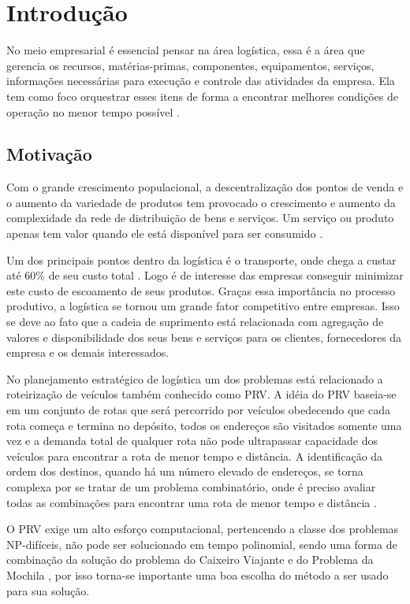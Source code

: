 \chapter[Introdução]{Introdução}

No meio empresarial é essencial pensar na área logística, essa é a área que gerencia os recursos, matérias-primas, componentes, equipamentos, serviços, informações necessárias para execução e controle das atividades da empresa. Ela tem como foco orquestrar esses itens de forma a encontrar melhores condições de operação no menor tempo possível \cite{DIAS}. 

\section{Motivação}

Com o grande crescimento populacional, a descentralização dos pontos de venda e o aumento da variedade de produtos tem provocado o crescimento e aumento da complexidade da rede de distribuição de bens e serviços. Um serviço ou produto apenas tem valor quando ele está disponível para ser consumido \cite{TSUDA}.

Um dos principais pontos dentro da logística é o transporte, onde chega a custar até
60\% de seu custo total \cite{RODRIGUES}. Logo é de interesse das empresas conseguir minimizar este custo de escoamento de seus produtos. Graças essa importância no processo produtivo, a logística se tornou um grande fator competitivo entre empresas. Isso se deve ao fato que a cadeia de suprimento está relacionada com agregação de valores e disponibilidade dos seus bens e serviços para os clientes, fornecedores da empresa e os demais interessados. 

No planejamento estratégico de logística um dos problemas está relacionado a roteirização de veículos \cite{TSUDA} também conhecido como PRV. 
A idéia do PRV baseia-se em um conjunto de rotas que será percorrido por veículos obedecendo que cada rota começa e termina no depósito, todos os endereços são visitados somente uma vez e a demanda total de qualquer rota não pode ultrapassar capacidade dos veículos para encontrar a rota de menor tempo e distância. A identificação da ordem dos destinos, quando há um número elevado de endereços, se torna complexa por se tratar de um problema combinatório, onde é preciso avaliar todas as combinações para encontrar uma rota de menor tempo e distância \cite{RMKarp}.

O PRV exige um alto esforço computacional, pertencendo a classe dos problemas NP-difíceis, não pode ser solucionado em tempo polinomial, sendo uma forma de combinação da solução do problema do Caixeiro Viajante e do Problema da Mochila \cite{HUMBERTO}, por isso torna-se importante uma boa escolha do método a ser usado para sua solução.

